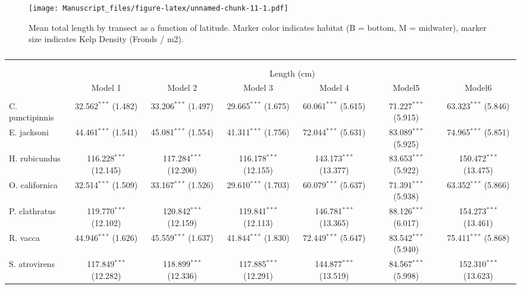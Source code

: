\documentclass[12pt,]{article}
\begin{document}
\begin{figure}
\centering
\texttt{[image: Manuscript\_files/figure-latex/unnamed-chunk-11-1.pdf]}
\caption{Mean total length by transect as a function of latitude. Marker
color indicates habitat (B = bottom, M = midwater), marker size
indicates Kelp Density (Fronds / m2).}
\end{figure}

\begin{landscape}


\begin{table}[!htbp] \centering 
  \caption{} 
  \label{} 
\tiny 
\begin{tabular}{@{\extracolsep{5pt}}lcccccc} 
\\[-1.8ex]\hline 
\hline \\[-1.8ex] 
\\[-1.8ex] & \multicolumn{6}{c}{Length (cm)} \\ 
 & Model 1 & Model 2 & Model 3 & Model 4 & Model5 & Model6 \\ 
\hline \\[-1.8ex] 
 C. punctipinnis & 32.562$^{***}$ (1.482) & 33.206$^{***}$ (1.497) & 29.665$^{***}$ (1.675) & 60.061$^{***}$ (5.615) & 71.227$^{***}$ (5.915) & 63.323$^{***}$ (5.846) \\ 
  E. jacksoni & 44.461$^{***}$ (1.541) & 45.081$^{***}$ (1.554) & 41.311$^{***}$ (1.756) & 72.044$^{***}$ (5.631) & 83.089$^{***}$ (5.925) & 74.965$^{***}$ (5.851) \\ 
  H. rubicundus & 116.228$^{***}$ (12.145) & 117.284$^{***}$ (12.200) & 116.178$^{***}$ (12.155) & 143.173$^{***}$ (13.377) & 83.653$^{***}$ (5.922) & 150.472$^{***}$ (13.475) \\ 
  O. californica & 32.514$^{***}$ (1.509) & 33.167$^{***}$ (1.526) & 29.610$^{***}$ (1.703) & 60.079$^{***}$ (5.637) & 71.391$^{***}$ (5.938) & 63.352$^{***}$ (5.866) \\ 
  P. clathratus & 119.770$^{***}$ (12.102) & 120.842$^{***}$ (12.159) & 119.841$^{***}$ (12.113) & 146.781$^{***}$ (13.365) & 88.126$^{***}$ (6.017) & 154.273$^{***}$ (13.461) \\ 
  R. vacca & 44.946$^{***}$ (1.626) & 45.559$^{***}$ (1.637) & 41.844$^{***}$ (1.830) & 72.449$^{***}$ (5.647) & 83.542$^{***}$ (5.940) & 75.411$^{***}$ (5.868) \\ 
  S. atrovirens & 117.849$^{***}$ (12.282) & 118.899$^{***}$ (12.336) & 117.885$^{***}$ (12.291) & 144.877$^{***}$ (13.519) & 84.567$^{***}$ (5.998) & 152.310$^{***}$ (13.623) \\ 

\end{tabular}
\end{table}
\end{landscape}
\end{document}
